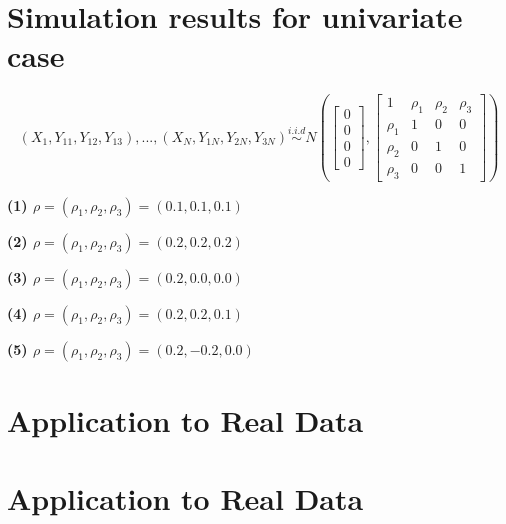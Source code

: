 \documentclass[12pt]{report}
\begin{document}
 
 
\newpage
\section{Simulation results for univariate case}

\begin{equation} 
\label{eq:latent}
(X_1, Y_{11}, Y_{12}, Y_{13}), ... , (X_N, Y_{1N}, Y_{2N}, Y_{3N})  \overset{i.i.d}{\sim} N \left( \begin{bmatrix} 0 \\ 0 \\ 0 \\ 0 \end{bmatrix}, \begin{bmatrix}1 & \rho_{1} & \rho_{2}&  \rho_{3} \\ \rho_{1} & 1 & 0 & 0 \\ \rho_{2} & 0 & 1 & 0 \\ \rho_{3} & 0 & 0 & 1  \end{bmatrix}  \right)
\end{equation}


\textbf{(1) $\rho = (\rho_{1}, \rho_{2}, \rho_{3}) = (0.1, 0.1, 0.1)$}




\textbf{(2) $\rho = (\rho_{1}, \rho_{2}, \rho_{3}) = (0.2, 0.2, 0.2)$}



\textbf{(3) $\rho = (\rho_{1}, \rho_{2}, \rho_{3}) = (0.2, 0.0, 0.0)$}



\textbf{(4) $\rho = (\rho_{1}, \rho_{2}, \rho_{3}) = (0.2, 0.2, 0.1)$}


\textbf{(5) $\rho = (\rho_{1}, \rho_{2}, \rho_{3}) = (0.2, -0.2, 0.0)$}





\newpage
\section{Application to Real Data}




\section{Application to Real Data}
\end{document}
